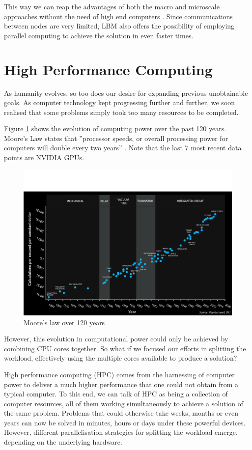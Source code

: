 \documentclass[12pt]{book}
\begin{document}
\par
This way we can reap the advantages of both the macro and microscale approaches without the need of high end computers \cite{lbm_springer}. Since communications between nodes are very limited, LBM also offers the possibility of employing parallel computing to achieve the solution in even faster times.



\section{High Performance Computing}
As humanity evolves, so too does our desire for expanding previous unobtainable goals. As computer technology kept progressing further and further, we soon realised that some problems simply took too many resources to be completed.\par
Figure \ref{fig:moore} shows the evolution of computing power over the past 120 years. Moore's Law states that ''processor speeds, or overall processing power for computers will double every two years'' \cite{moore}. Note that the last 7 most recent data points are NVIDIA GPUs.

\begin{figure}[H]
\centering
  \includegraphics[width=0.6\linewidth]{Resources/Images/moore120.png}
  \caption{Moore's law over 120 years}
  \label{fig:moore}
\end{figure}

However, this evolution in computational power could only be achieved by combining CPU cores together.
So what if we focused our efforts in splitting the workload, effectively using the multiple cores available to produce a solution?\par
High performance computing (HPC) comes from the harnessing of computer power to deliver a much higher performance that one could not obtain from a typical computer. To this end, we can talk of HPC as being a collection of computer resources, all of them working simultaneously to achieve a solution of the same problem. Problems that could otherwise take weeks, months or even years can now be solved in minutes, hours or days under these powerful devices. However, different parallelisation strategies for splitting the workload emerge, depending on the underlying hardware. 
\end{document}
